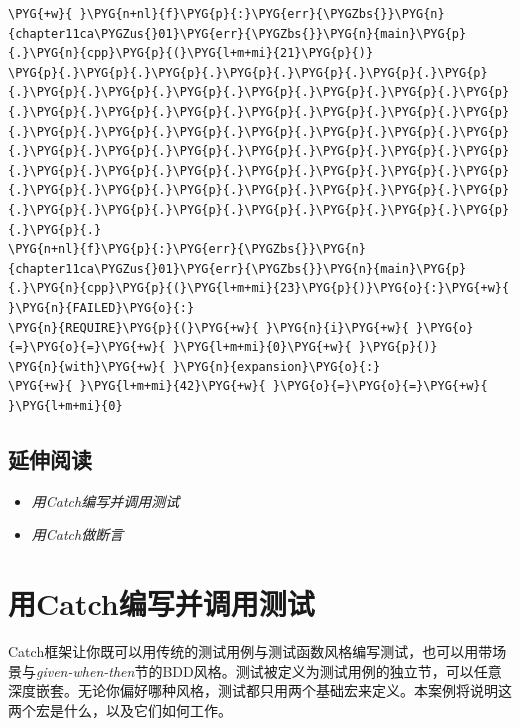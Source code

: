 \begin{codeblockbg}
\begin{Verbatim}[commandchars=\\\{\},breaklines=true,breakanywhere=true,fontsize=\codefont,xleftmargin=17bp]
\PYG{+w}{ }\PYG{n+nl}{f}\PYG{p}{:}\PYG{err}{\PYGZbs{}}\PYG{n}{chapter11ca\PYGZus{}01}\PYG{err}{\PYGZbs{}}\PYG{n}{main}\PYG{p}{.}\PYG{n}{cpp}\PYG{p}{(}\PYG{l+m+mi}{21}\PYG{p}{)}
\PYG{p}{.}\PYG{p}{.}\PYG{p}{.}\PYG{p}{.}\PYG{p}{.}\PYG{p}{.}\PYG{p}{.}\PYG{p}{.}\PYG{p}{.}\PYG{p}{.}\PYG{p}{.}\PYG{p}{.}\PYG{p}{.}\PYG{p}{.}\PYG{p}{.}\PYG{p}{.}\PYG{p}{.}\PYG{p}{.}\PYG{p}{.}\PYG{p}{.}\PYG{p}{.}\PYG{p}{.}\PYG{p}{.}\PYG{p}{.}\PYG{p}{.}\PYG{p}{.}\PYG{p}{.}\PYG{p}{.}\PYG{p}{.}\PYG{p}{.}\PYG{p}{.}\PYG{p}{.}\PYG{p}{.}\PYG{p}{.}\PYG{p}{.}\PYG{p}{.}\PYG{p}{.}\PYG{p}{.}\PYG{p}{.}\PYG{p}{.}\PYG{p}{.}\PYG{p}{.}\PYG{p}{.}\PYG{p}{.}\PYG{p}{.}\PYG{p}{.}\PYG{p}{.}\PYG{p}{.}\PYG{p}{.}\PYG{p}{.}\PYG{p}{.}\PYG{p}{.}\PYG{p}{.}\PYG{p}{.}\PYG{p}{.}\PYG{p}{.}\PYG{p}{.}
\PYG{n+nl}{f}\PYG{p}{:}\PYG{err}{\PYGZbs{}}\PYG{n}{chapter11ca\PYGZus{}01}\PYG{err}{\PYGZbs{}}\PYG{n}{main}\PYG{p}{.}\PYG{n}{cpp}\PYG{p}{(}\PYG{l+m+mi}{23}\PYG{p}{)}\PYG{o}{:}\PYG{+w}{ }\PYG{n}{FAILED}\PYG{o}{:}
\PYG{n}{REQUIRE}\PYG{p}{(}\PYG{+w}{ }\PYG{n}{i}\PYG{+w}{ }\PYG{o}{=}\PYG{o}{=}\PYG{+w}{ }\PYG{l+m+mi}{0}\PYG{+w}{ }\PYG{p}{)}
\PYG{n}{with}\PYG{+w}{ }\PYG{n}{expansion}\PYG{o}{:}
\PYG{+w}{ }\PYG{l+m+mi}{42}\PYG{+w}{ }\PYG{o}{=}\PYG{o}{=}\PYG{+w}{ }\PYG{l+m+mi}{0}
\end{Verbatim}
\end{codeblockbg}



\subsection{延伸阅读}



\begin{itemize}
\item \textit{用Catch编写并调用测试}



\item \textit{用Catch做断言}

\end{itemize}



\section{用Catch编写并调用测试}



Catch框架让你既可以用传统的测试用例与测试函数风格编写测试，也可以用带场景与\textit{given-when-then}节的BDD风格。测试被定义为测试用例的独立节，可以任意深度嵌套。无论你偏好哪种风格，测试都只用两个基础宏来定义。本案例将说明这两个宏是什么，以及它们如何工作。


